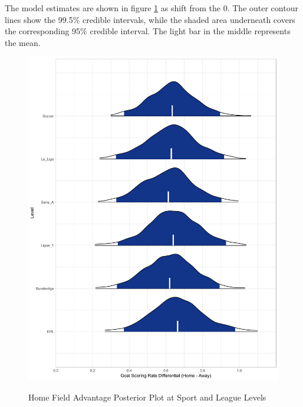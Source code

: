 \documentclass[USenglish]{article}
\begin{document}
The model estimates are shown in figure \ref{fig31} as shift from the 0. The outer contour lines show the 99.5\% credible intervals, while the shaded area underneath covers the corresponding 95\% credible interval. The light bar in the middle represents the mean.

\begin{figure}
\caption{Home Field Advantage Posterior Plot at Sport and League Levels}
{\includegraphics[width=0.80\linewidth]{HFA32.pdf}}
\label{fig31}
\end{figure}
\end{document}
